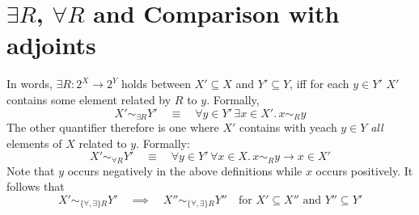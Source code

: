 

\section{$\exists R$, $\forall R$ and Comparison with adjoints}
In words, $\exists R : 2^X \to 2^Y$ holds between $X' \subseteq X$ and
$Y' \subseteq Y$, iff for each $y \in Y'$ $X'$ contains some element
related by $R$ to $y$. Formally,
\begin{equation}\label{eq:existsR}
X' \sim_{\exists R} Y' \quad \equiv \quad \forall y \in
Y'\,\exists x \in X'.\, x \sim_R y
\end{equation}
% 
The other quantifier therefore is one where $X'$ contains with yeach $y\in
Y$ \emph{all} elements of $X$ related to $y$. Formally:
\begin{equation}\label{eq:forallR}
X' \sim_{\forall R} Y' \quad \equiv \quad \forall y \in Y' \, \forall
x \in X.\,x \sim_R y \rightarrow x \in X'
\end{equation}
% 
Note that $y$ occurs negatively in the above definitions while $x$
occurs positively. It follows that 
\[
X' \sim_{\{\forall,\exists\}R} Y' \quad \implies \quad X''
\sim_{\{\forall,\exists\}R} Y'' \quad \text{for }X' \subseteq X''
\text{ and }Y'' \subseteq Y'
\]

